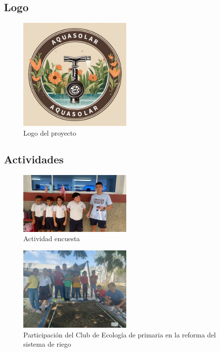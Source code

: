 \documentclass[12pt]{article}
\begin{document}
\subsection*{Logo}
\begin{figure}[h!]
      \centering
      \includegraphics[width=0.5\textwidth]{imagenes/logo.png}
      \caption{Logo del proyecto}
      \label{fig:logo}
\end{figure}

\subsection*{Actividades}
\begin{figure}[h!]
      \centering
      \includegraphics[width=0.5\textwidth]{imagenes/actividad1.jpg}
      \caption{Actividad encuesta}
      \label{fig:actividad1}
\end{figure}

\begin{figure}[h!]
      \centering
      \includegraphics[width=0.5\textwidth]{imagenes/actividad2.jpg}
      \caption{Participación del Club de Ecología de primaria en la reforma del sistema de riego}
      \label{fig:actividad2}
\end{figure}
\end{document}
